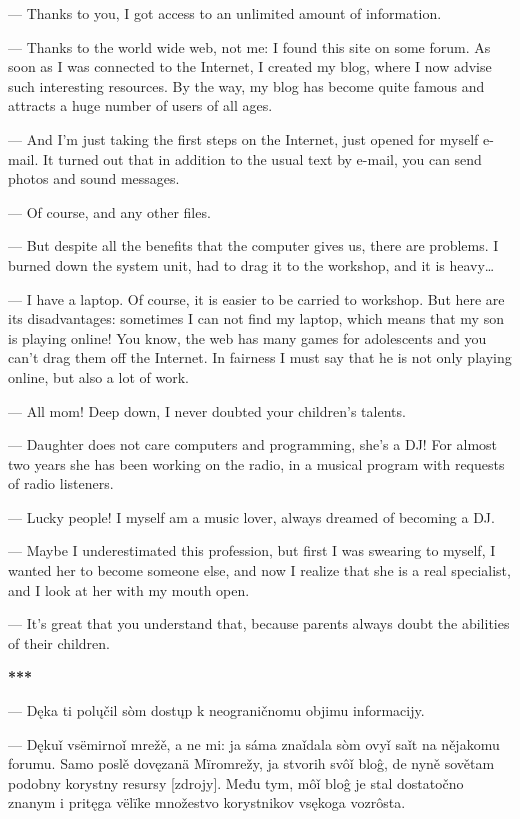 — Thanks to you, I got access to an unlimited amount of information.

— Thanks to the world wide web, not me: I found this site on some forum. As soon as I was connected to the Internet, I created my blog, where I now advise such interesting resources. By the way, my blog has become quite famous and attracts a huge number of users of all ages.

— And I’m just taking the first steps on the Internet, just opened for myself e-mail. It turned out that in addition to the usual text by e-mail, you can send photos and sound messages.

— Of course, and any other files.

— But despite all the benefits that the computer gives us, there are problems. I burned down the system unit, had to drag it to the workshop, and it is heavy…

— I have a laptop. Of course, it is easier to be carried to workshop. But here are its disadvantages: sometimes I can not find my laptop, which means that my son is playing online! You know, the web has many games for adolescents and you can't drag them off the Internet. In fairness I must say that he is not only playing online, but also a lot of work.

— All mom! Deep down, I never doubted your children’s talents.

— Daughter does not care computers and programming, she’s a DJ! For almost two years she has been working on the radio, in a musical program with requests of radio listeners.

— Lucky people! I myself am a music lover, always dreamed of becoming a DJ.

— Maybe I underestimated this profession, but first I was swearing to myself, I wanted her to become someone else, and now I realize that she is a real specialist, and I look at her with my mouth open.

— It’s great that you understand that, because parents always doubt the abilities of their children.

\begin{center}
	\textbf{***}
\end{center}

— Dęka ti polųčil sòm dostųp k neograničnomu objimu informacijy.

— Dękuǐ vsëmirnoǐ mrežě, a ne mi: ja sáma znaǐdala sòm ovyǐ saǐt na nějakomu forumu. Samo poslě dovęzanä Mïromrežy, ja stvorih svôǐ bloĝ, de nyně sovětam podobny korystny resursy [zdrojy]. Među tym, môǐ bloĝ je stal dostatočno znanym i pritęga vëlïke množestvo korystnikov vsękoga vozrôsta.

